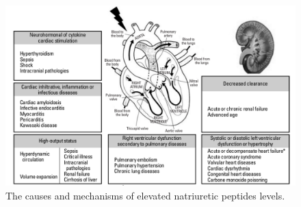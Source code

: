 \documentclass[14pt,a4paper,onecolumn]{extarticle}
\begin{document}
\begin{figure}
    \centering
    \includegraphics[scale=0.3]{../../images/NP_causes.png}
    \small\caption{The causes and mechanisms of elevated natriuretic peptides levels.}
    \label{NP_causes}
\end{figure}
\end{document}

